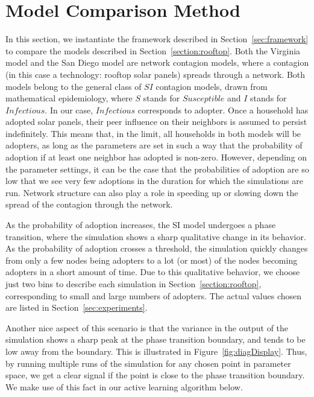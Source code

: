 \section{Model Comparison Method}
\label{sec:learning}


In this section, we instantiate the framework described in Section~\ref{sec:framework} to compare the models described in Section~\ref{section:rooftop}. 
Both the Virginia model and the San Diego model are network contagion models,
where a contagion (in this case a technology: rooftop solar panels) spreads through a network. Both models belong to the general class of $SI$ contagion models,
drawn from mathematical epidemiology, where $S$ stands for $Susceptible$
and $I$ stands for $Infectious$. In our case, $Infectious$ corresponds to adopter. Once a household has adopted solar panels, their peer influence on their neighbors is assumed to persist indefinitely.
This means that, in the limit, all households in both models will be adopters, as
long as the parameters are set in such a way that the probability of adoption if at
least one neighbor has adopted is non-zero. However, depending on the parameter
settings, it can be the case that the probabilities of adoption are so low that 
we see very few adoptions in the duration for which the simulations are run. Network
structure can also play a role in speeding up or slowing down the spread of the 
contagion through the network.

As the probability of adoption increases, the SI model undergoes a phase transition,
where the simulation shows a sharp qualitative change in its behavior. As the probability of adoption crosses a threshold, the simulation quickly changes from only a few nodes being adopters to a lot (or most) of the nodes becoming adopters in a short amount of time. Due to this qualitative behavior, we choose just two bins to describe each simulation in Section~\ref{section:rooftop}, corresponding to small and large numbers of adopters. The actual values chosen are listed in Section~\ref{sec:experiments}.

Another nice aspect of this scenario is that the variance in the output of the 
simulation shows a sharp peak at the phase transition boundary, and tends to be low
away from the boundary. This is illustrated in Figure~\ref{fig:diagDisplay}. Thus, by running multiple runs of the simulation for any 
chosen point in parameter space, we get a clear signal if the point is close to the phase transition boundary. We make use of this fact in our active learning algorithm below.


